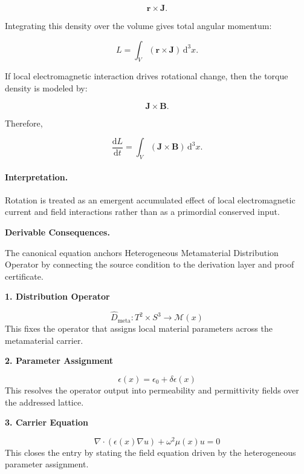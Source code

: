 \begin{equation}
\mathbf{r}\times\mathbf{J}.
\end{equation}

Integrating this density over the volume gives total angular momentum:

\begin{equation}
\boxed{
L
=
\int_V
(\mathbf{r}\times\mathbf{J})
\,\mathrm{d}^3x .
}
\end{equation}

If local electromagnetic interaction drives rotational change, then the torque density is modeled by:

\begin{equation}
\mathbf{J}\times\mathbf{B}.
\end{equation}

Therefore,

\begin{equation}
\boxed{
\frac{\mathrm{d}L}{\mathrm{d}t}
=
\int_V
(\mathbf{J}\times\mathbf{B})
\,\mathrm{d}^3x .
}
\end{equation}

\paragraph{Interpretation.}
Rotation is treated as an emergent accumulated effect of local electromagnetic current and field interactions rather than as a primordial conserved input.

\par\vspace{0.35em}
\noindent\textbf{Derivable Consequences.}\quad
\begingroup
\footnotesize
\raggedright
The canonical equation anchors Heterogeneous Metamaterial Distribution Operator by connecting the source condition to the derivation layer and proof certificate.
\par\endgroup

\noindent\textbf{1. Distribution Operator}\par
\[
\widehat{D}_{\mathrm{meta}}:T^{2}\times S^{3}\to\mathcal{M}(x)
\]
\noindent This fixes the operator that assigns local material parameters across the metamaterial carrier.\par
\noindent\textbf{2. Parameter Assignment}\par
\[
\epsilon(x)=\epsilon_{0}+\delta\epsilon(x)
\]
\noindent This resolves the operator output into permeability and permittivity fields over the addressed lattice.\par
\noindent\textbf{3. Carrier Equation}\par
\[
\nabla\cdot\!\left(\epsilon(x)\nabla u\right)+\omega^{2}\mu(x)u=0
\]
\noindent This closes the entry by stating the field equation driven by the heterogeneous parameter assignment.\par

